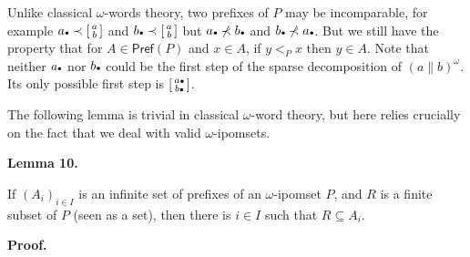 \documentclass[10pt,a4paper]{article}
\begin{document}
 
Unlike classical $\omega$-words theory, two prefixes of $P$ may be incomparable, for example $a\vbox{\hbox{\tiny$\bullet$}}\prec\left[\begin{smallmatrix}a\\
b\end{smallmatrix}\right]$ and $b\vbox{\hbox{\tiny$\bullet$}}\prec\left[\begin{smallmatrix}a\\
b\end{smallmatrix}\right]$ but $a\vbox{\hbox{\tiny$\bullet$}}\not\prec b\vbox{\hbox{\tiny$\bullet$}}$ and $b\vbox{\hbox{\tiny$\bullet$}}\not\prec a\vbox{\hbox{\tiny$\bullet$}}$. But we still have the property that for $A\in\mathsf{Pref}(P)$ and $x\in A$, if $y<_{P}x$ then $y\in A$. Note that neither $a\vbox{\hbox{\tiny$\bullet$}}$ nor $b\vbox{\hbox{\tiny$\bullet$}}$ could be the first step of the sparse decomposition of $(a\parallel b)^{\omega}$. Its only possible first step is $\left[\begin{smallmatrix}a\vbox{\hbox{\tiny$\bullet$}}\\
b\vbox{\hbox{\tiny$\bullet$}}\end{smallmatrix}\right]$.\par
 
 
 
 
The following lemma is trivial in classical $\omega$-word theory, but here relies crucially on the fact that we deal with valid $\omega$-ipomsets.\par
 
 
 
\par\medskip\noindent\textbf{Lemma 10.}\par
 
 
If $(A_{i})_{i\in I}$ is an infinite set of prefixes of an $\omega$-ipomset $P$, and $R$ is a finite subset of $P$ (seen as a set), then there is $i\in I$ such that $R\subseteq A_{i}$.\par
 
 
 
 
\par\medskip\noindent\textbf{Proof.}\par
 
\end{document}
